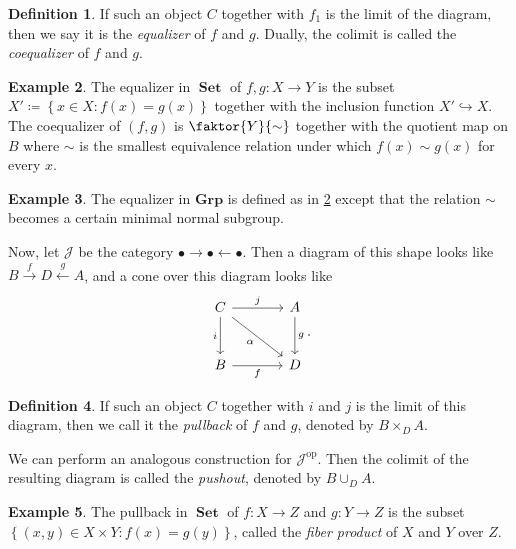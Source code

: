 \documentclass[10pt,letterpaper,cm]{nupset}
\theoremstyle{definition}
\newtheorem{definition}{Definition}[section]
\newtheorem{exmp}[definition]{Example}
\theoremstyle{theorem}
\theoremstyle{remark}
\newcommand{\1}{\mathbf{1}}
\renewcommand{\j}{\mathscr{J}}
\newcommand{\0}{\vec 0}
\DeclareMathOperator{\op}{op}
\DeclareMathOperator{\set}{\mathbf{Set}}
\begin{document}
\begin{definition}
If such an object $C$ together with $f_1$ is the limit of the diagram, then we say it is the \textit{equalizer} of $f$ and $g$. Dually, the colimit is called the \textit{coequalizer} of $f$ and $g$.
\end{definition}

\begin{exmp}\label{set}
The equalizer in $\set$ of $f, g: X \to Y$ is the subset $X'\coloneqq \left\{x \in X : f(x) = g(x)\right\}$ together with the inclusion function $X' \hookrightarrow X$. The coequalizer of $\left(f, g\right)$ is $\faktor{Y}{\sim}$ together with the quotient map on $B$ where $\sim$ is the smallest equivalence relation under which $f(x) \sim g(x)$ for every $x$.
\end{exmp}

\begin{exmp}
The equalizer in $\mathbf{Grp}$ is defined as in \cref{set} except that the relation $\sim$ becomes a certain minimal normal subgroup.
\end{exmp}

\smallskip

Now, let $\j$ be the category $\bullet \rightarrow \bullet \leftarrow \bullet$. Then a diagram of this shape looks like $B \overset{f}{\longrightarrow} D \overset{g}{\longleftarrow} A$, and a cone over this diagram looks like 
\[
\begin{tikzcd}[row sep=large, column sep=large]
C \arrow[to=Z, "i ", swap] \arrow[to=2-2, dr, "\alpha", swap]
& A \arrow[to=2-2, "g "] \\
|[alias=Z]| B  \arrow[to=2-2, "f"'] 
& D
\arrow[from=ul, to=1-2, "j "]
\end{tikzcd}.
\]

\begin{definition}
If such an object $C$ together with $i$ and $j$ is the limit of this diagram, then we call it the \textit{pullback} of $f$ and $g$, denoted by $B \times_{D} A$.
\end{definition}


We can perform an analogous construction for $\j^{\op}$. Then the colimit of the resulting diagram is called the \textit{pushout}, denoted by $B \cup_{D} A$.


\begin{exmp}
The pullback in $\set$ of $f: X \to Z$ and $g: Y \to Z$ is the subset $\left\{\left(x,y\right) \in X \times Y : f(x) = g(y)\right\}$, called the \textit{fiber product} of $X$ and $Y$ over $Z$.
\end{exmp}
\end{document}
